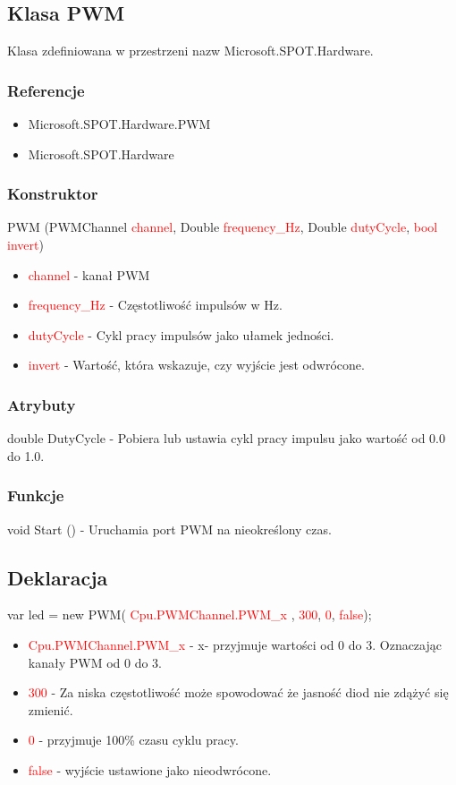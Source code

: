 \documentclass{article}
\begin{document}
\subsection{Klasa PWM}
Klasa zdefiniowana w przestrzeni nazw Microsoft.SPOT.Hardware. 
\subsubsection{Referencje}
\begin{itemize}
\item Microsoft.SPOT.Hardware.PWM
\item Microsoft.SPOT.Hardware
\end{itemize}
\subsubsection{Konstruktor}
PWM (PWMChannel \textcolor{red}{channel}, Double \textcolor{red}{frequency\_Hz}, Double \textcolor{red}{dutyCycle},  \textcolor{red}{bool invert})
\begin{itemize}
\item \textcolor{red}{channel} - kanał PWM
\item \textcolor{red}{frequency\_Hz} - Częstotliwość impulsów w Hz.
\item \textcolor{red}{dutyCycle} - Cykl pracy impulsów jako ułamek jedności.
\item \textcolor{red}{invert} - Wartość, która wskazuje, czy wyjście jest odwrócone.
\end{itemize}
\subsubsection{Atrybuty}
double DutyCycle - Pobiera lub ustawia cykl pracy impulsu jako wartość od 0.0 do 1.0.
\subsubsection{Funkcje}
void Start () - Uruchamia port PWM na nieokreślony czas.
\subsection{Deklaracja}
 var led = new PWM(\space \textcolor{red}{ Cpu.PWMChannel.PWM\_x },\space \textcolor{red}{ 300},\space \textcolor{red}{ 0}, \space \textcolor{red}{ false});
\begin{itemize}
\item \textcolor{red}{Cpu.PWMChannel.PWM\_x} - x- przyjmuje wartości od 0 do 3. Oznaczając kanały PWM od 0 do 3.
\item \textcolor{red}{300} - Za niska częstotliwość może spowodować że jasność diod nie zdążyć się zmienić.
\item \textcolor{red}{0} - przyjmuje 100\% czasu cyklu pracy.
\item \textcolor{red}{false} - wyjście ustawione jako nieodwrócone.
\end{itemize}
\end{document}
